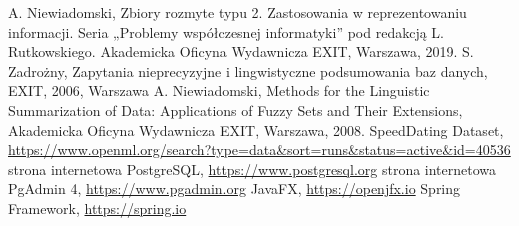\documentclass{classrep}
\begin{document}


\begin{thebibliography}{99}
  A. Niewiadomski, Zbiory rozmyte typu 2. Zastosowania w reprezentowaniu informacji.  Seria „Problemy współczesnej informatyki” pod redakcją L. Rutkowskiego. Akademicka Oficyna Wydawnicza EXIT, Warszawa, 2019.
 S. Zadrożny, Zapytania nieprecyzyjne i lingwistyczne podsumowania baz danych, EXIT, 2006, Warszawa
 A. Niewiadomski, Methods for the Linguistic Summarization of Data: Applications of Fuzzy Sets and Their Extensions, Akademicka Oficyna Wydawnicza EXIT, Warszawa, 2008.
 SpeedDating Dataset, \url{https://www.openml.org/search?type=data&sort=runs&status=active&id=40536}
 strona internetowa PostgreSQL, \url{https://www.postgresql.org}
 strona internetowa PgAdmin 4, \url{https://www.pgadmin.org}
 JavaFX, \url{https://openjfx.io}
 Spring Framework, \url{https://spring.io}

\end{thebibliography}

\end{document}
